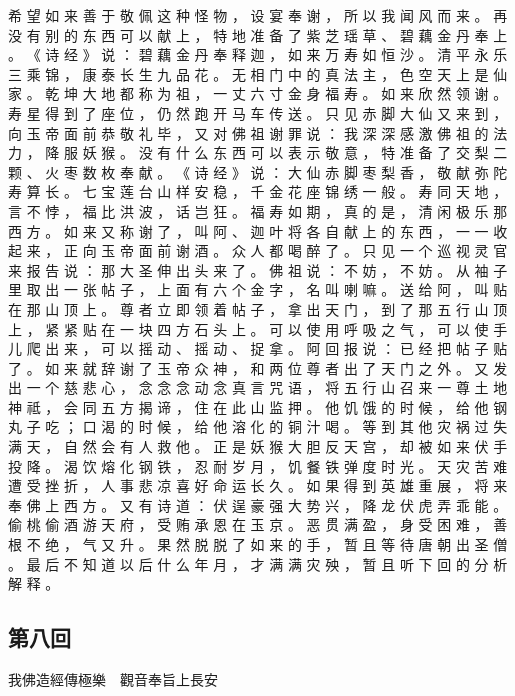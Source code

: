 {希 望 如 来 善 于 敬 佩 这 种 怪 物 ， 设 宴 奉 谢 ， 所 以 我 闻 风 而 来 。
再 没 有 别 的 东 西 可 以 献 上 ， 特 地 准 备 了 紫 芝 瑶 草 、 碧 藕 金 丹 奉 上 。
《 诗 经 》 说 ： 碧 藕 金 丹 奉 释 迦 ， 如 来 万 寿 如 恒 沙 。
清 平 永 乐 三 乘 锦 ， 康 泰 长 生 九 品 花 。
无 相 门 中 的 真 法 主 ， 色 空 天 上 是 仙 家 。
乾 坤 大 地 都 称 为 祖 ， 一 丈 六 寸 金 身 福 寿 。
如 来 欣 然 领 谢 。
寿 星 得 到 了 座 位 ， 仍 然 跑 开 马 车 传 送 。
只 见 赤 脚 大 仙 又 来 到 ， 向 玉 帝 面 前 恭 敬 礼 毕 ， 又 对 佛 祖 谢 罪 说 ： 我 深 深 感 激 佛 祖 的 法 力 ， 降 服 妖 猴 。
没 有 什 么 东 西 可 以 表 示 敬 意 ， 特 准 备 了 交 梨 二 颗 、 火 枣 数 枚 奉 献 。
《 诗 经 》 说 ： 大 仙 赤 脚 枣 梨 香 ， 敬 献 弥 陀 寿 算 长 。
七 宝 莲 台 山 样 安 稳 ， 千 金 花 座 锦 绣 一 般 。
寿 同 天 地 ， 言 不 悖 ， 福 比 洪 波 ， 话 岂 狂 。
福 寿 如 期 ， 真 的 是 ， 清 闲 极 乐 那 西 方 。
如 来 又 称 谢 了 ， 叫 阿 、 迦 叶 将 各 自 献 上 的 东 西 ， 一 一 收 起 来 ， 正 向 玉 帝 面 前 谢 酒 。
众 人 都 喝 醉 了 。
只 见 一 个 巡 视 灵 官 来 报 告 说 ： 那 大 圣 伸 出 头 来 了 。
佛 祖 说 ： 不 妨 ， 不 妨 。
从 袖 子 里 取 出 一 张 帖 子 ， 上 面 有 六 个 金 字 ， 名 叫 喇 嘛 。
送 给 阿 ， 叫 贴 在 那 山 顶 上 。
尊 者 立 即 领 着 帖 子 ， 拿 出 天 门 ， 到 了 那 五 行 山 顶 上 ， 紧 紧 贴 在 一 块 四 方 石 头 上 。
可 以 使 用 呼 吸 之 气 ， 可 以 使 手 儿 爬 出 来 ， 可 以 摇 动 、 摇 动 、 捉 拿 。
阿 回 报 说 ： 已 经 把 帖 子 贴 了 。
如 来 就 辞 谢 了 玉 帝 众 神 ， 和 两 位 尊 者 出 了 天 门 之 外 。
又 发 出 一 个 慈 悲 心 ， 念 念 念 动 念 真 言 咒 语 ， 将 五 行 山 召 来 一 尊 土 地 神 祗 ， 会 同 五 方 揭 谛 ， 住 在 此 山 监 押 。
他 饥 饿 的 时 候 ， 给 他 钢 丸 子 吃 ； 口 渴 的 时 候 ， 给 他 溶 化 的 铜 汁 喝 。
等 到 其 他 灾 祸 过 失 满 天 ， 自 然 会 有 人 救 他 。
正 是 妖 猴 大 胆 反 天 宫 ， 却 被 如 来 伏 手 投 降 。
渴 饮 熔 化 钢 铁 ， 忍 耐 岁 月 ， 饥 餐 铁 弹 度 时 光 。
天 灾 苦 难 遭 受 挫 折 ， 人 事 悲 凉 喜 好 命 运 长 久 。
如 果 得 到 英 雄 重 展 ， 将 来 奉 佛 上 西 方 。
又 有 诗 道 ： 伏 逞 豪 强 大 势 兴 ， 降 龙 伏 虎 弄 乖 能 。
偷 桃 偷 酒 游 天 府 ， 受 贿 承 恩 在 玉 京 。
恶 贯 满 盈 ， 身 受 困 难 ， 善 根 不 绝 ， 气 又 升 。
果 然 脱 脱 了 如 来 的 手 ， 暂 且 等 待 唐 朝 出 圣 僧 。
最 后 不 知 道 以 后 什 么 年 月 ， 才 满 满 灾 殃 ， 暂 且 听 下 回 的 分 析 解 释 。
}\switchcolumn\flushpage  \begin{pinyinscope}{\myfontt \section{第八回}     我佛造經傳極樂　觀音奉旨上長安

}
\end{pinyinscope}
